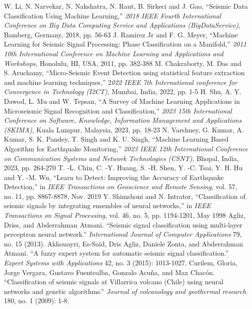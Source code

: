 \documentclass[conference]{IEEEtran}
\begin{document}
\begin{thebibliography}{00}
 W. Li, N. Narvekar, N. Nakshatra, N. Raut, B. Sirkeci and J. Gao, ``Seismic Data Classification Using Machine Learning,'' \textit{2018 IEEE Fourth International Conference on Big Data Computing Service and Applications (BigDataService)}, Bamberg, Germany, 2018, pp. 56-63
 J. Ramirez Jr and F. G. Meyer, ``Machine Learning for Seismic Signal Processing: Phase Classification on a Manifold,'' \textit{2011 10th International Conference on Machine Learning and Applications and Workshops}, Honolulu, HI, USA, 2011, pp. 382-388
 M. Chakraborty, M. Das and S. Aruchamy, ``Micro-Seismic Event Detection using statistical feature extraction and machine learning techniques,'' 2\textit{022 IEEE 7th International conference for Convergence in Technology (I2CT)}, Mumbai, India, 2022, pp. 1-5
 H. Shu, A. Y. Dawod, L. Mu and W. Tepsan, ``A Survey of Machine Learning Applications in Microseismic Signal Recognition and Classification,'' \textit{2023 15th International Conference on Software, Knowledge, Information Management and Applications (SKIMA)}, Kuala Lumpur, Malaysia, 2023, pp. 18-23
 N. Varshney, G. Kumar, A. Kumar, S. K. Pandey, T. Singh and K. U. Singh, ``Machine Learning Based Algorithm for Earthquake Monitoring,'' \textit{2023 IEEE 12th International Conference on Communication Systems and Network Technologies (CSNT)}, Bhopal, India, 2023, pp. 264-270
 T. -L. Chin, C. -Y. Huang, S. -H. Shen, Y. -C. Tsai, Y. H. Hu and Y. -M. Wu, ``Learn to Detect: Improving the Accuracy of Earthquake Detection,'' in \textit{IEEE Transactions on Geoscience and Remote Sensing}, vol. 57, no. 11, pp. 8867-8878, Nov. 2019
Y. Shimshoni and N. Intrator, ``Classification of seismic signals by integrating ensembles of neural networks,'' in \textit{IEEE Transactions on Signal Processing}, vol. 46, no. 5, pp. 1194-1201, May 1998
Agliz, Driss, and Abderrahman Atmani. ``Seismic signal classification using multi-layer perceptron neural network.'' \textit{International Journal of Computer Applications} 79, no. 15 (2013).
Akhouayri, Es-Saïd, Dris Agliz, Daniele Zonta, and Abderrahman Atmani. ``A fuzzy expert system for automatic seismic signal classification.'' \textit{Expert Systems with Applications} 42, no. 3 (2015): 1013-1027.
Curilem, Gloria, Jorge Vergara, Gustavo Fuentealba, Gonzalo Acuña, and Max Chacón. ``Classification of seismic signals at Villarrica volcano (Chile) using neural networks and genetic algorithms.'' \textit{Journal of volcanology and geothermal research} 180, no. 1 (2009): 1-8.
\end{thebibliography}
\end{document}
